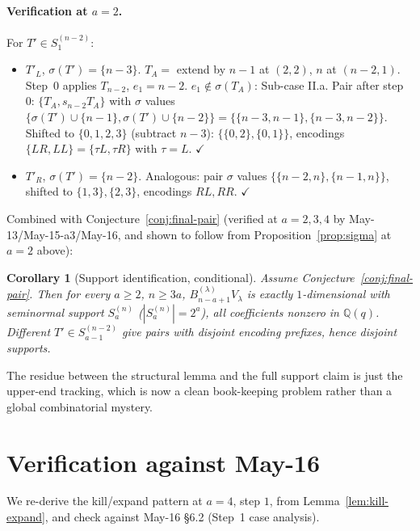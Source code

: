 \documentclass[11pt]{article}
\newtheorem{corollary}[theorem]{Corollary}
\theoremstyle{definition}
\begin{document}
\paragraph{Verification at $a=2$.}  For $T'\in S_1^{(n-2)}$:
\begin{itemize}[leftmargin=2em,topsep=0.3em,itemsep=0.2em]
\item $T'_L$, $\sigma(T')=\{n-3\}$.  $T_A=$ extend by $n-1$ at $(2,2)$,
  $n$ at $(n-2,1)$.  Step~$0$ applies $T_{n-2}$, $e_1=n-2$.
  $e_1\notin\sigma(T_A)$: Sub-case II.a.  Pair after step~$0$:
  $\{T_A,s_{n-2}T_A\}$ with $\sigma$ values
  $\{\sigma(T')\cup\{n-1\},\sigma(T')\cup\{n-2\}\}=\{\{n-3,n-1\},\{n-3,n-2\}\}$.
  Shifted to $\{0,1,2,3\}$ (subtract $n-3$):
  $\{\{0,2\},\{0,1\}\}$, encodings $\{LR,LL\}=\{\tau L,\tau R\}$ with
  $\tau=L$.  $\checkmark$
\item $T'_R$, $\sigma(T')=\{n-2\}$.  Analogous: pair $\sigma$ values
  $\{\{n-2,n\},\{n-1,n\}\}$, shifted to $\{1,3\},\{2,3\}$, encodings
  $RL,RR$.  $\checkmark$
\end{itemize}

Combined with Conjecture~\ref{conj:final-pair} (verified at $a=2,3,4$
by May-13/May-15-a3/May-16, and shown to follow from
Proposition~\ref{prop:sigma} at $a=2$ above):

\begin{corollary}[Support identification, conditional]\label{cor:support}
Assume Conjecture~\ref{conj:final-pair}.  Then for every $a\ge 2$,
$n\ge 3a$, $B_{n-a+1}^{(\lambda)}V_\lambda$ is exactly
$1$-dimensional with seminormal support $S_a^{(n)}$ ($|S_a^{(n)}|=2^a$),
all coefficients nonzero in $\mathbb{Q}(q)$.  Different
$T'\in S_{a-1}^{(n-2)}$ give pairs with disjoint encoding prefixes,
hence disjoint supports.
\end{corollary}

The residue between the structural lemma and the full support claim
is just the upper-end tracking, which is now a clean book-keeping
problem rather than a global combinatorial mystery.

\section{Verification against May-16}\label{sec:verify}

We re-derive the kill/expand pattern at $a=4$, step $1$, from
Lemma~\ref{lem:kill-expand}, and check against May-16
\S6.2 (Step~1 case analysis).
\end{document}
